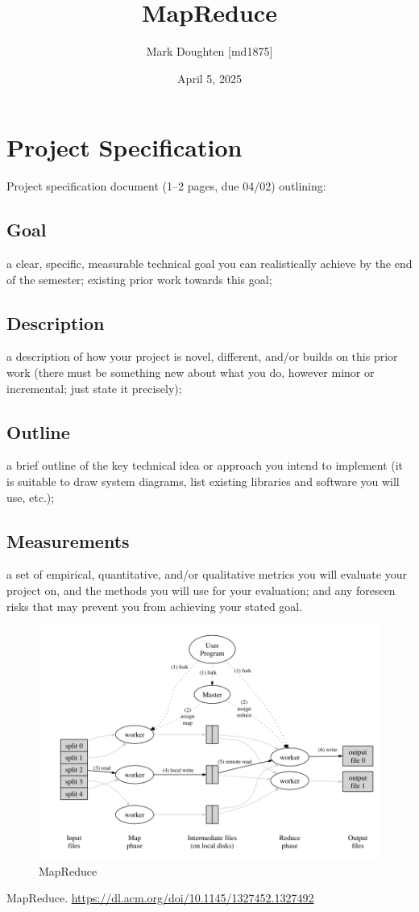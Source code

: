 \documentclass{article}
\title{MapReduce}
\author{Mark Doughten [md1875]}
\date{April 5, 2025}
\begin{document}
\maketitle
\section{Project Specification}

Project specification document (1--2 pages, due 04/02) outlining:

\subsection{Goal}
a clear, specific, measurable technical goal you can realistically achieve by the end of the semester;
existing prior work towards this goal;

\subsection{Description}
a description of how your project is novel, different, and/or builds on this prior work (there must be something new about what you do, however minor or incremental; just state it precisely);

\subsection{Outline}
a brief outline of the key technical idea or approach you intend to implement (it is suitable to draw system diagrams, list existing libraries and software you will use, etc.);

\subsection{Measurements}
a set of empirical, quantitative, and/or qualitative metrics you will evaluate your project on, and the methods you will use for your evaluation; and
any foreseen risks that may prevent you from achieving your stated goal.

\begin{figure}[ht]
    \centering
    \includegraphics[width=1\linewidth]{./images/mapreduce.png}
    \caption{MapReduce \cite{mapreduce}}
    \label{fig:chroot}
\end{figure}

\begin{thebibliography}{}
\raggedright

MapReduce.
\href{https://dl.acm.org/doi/10.1145/1327452.1327492}{https://dl.acm.org/doi/10.1145/1327452.1327492}

\end{thebibliography}
\end{document}
